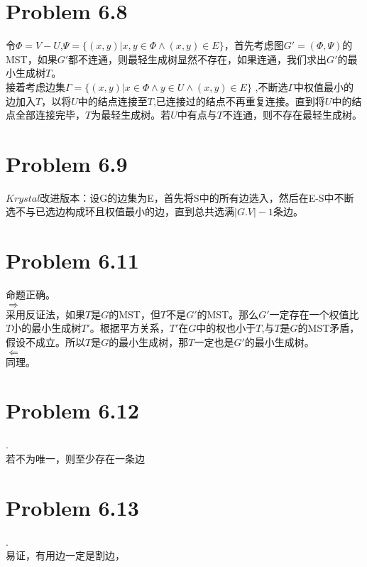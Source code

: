\documentclass[twocolumn]{ctexart}
\begin{document}
\section*{Problem 6.8}
\indent 令$\varPhi=V-U$,$\varPsi=\{(x,y)|x,y\in\varPhi \wedge (x,y)\in E\}$，首先考虑图$G'=(\varPhi,\varPsi)$的MST，如果$G'$都不连通，则最轻生成树显然不存在，如果连通，我们求出$G'$的最小生成树$T$。\\
\indent 接着考虑边集$\Gamma=\{(x,y)|x\in\varPhi \wedge y\in U \wedge (x,y)\in E \}$
,不断选$\Gamma$中权值最小的边加入$T$，以将$U$中的结点连接至$T$,已连接过的结点不再重复连接。直到将$U$中的结点全部连接完毕，$T$为最轻生成树。若$U$中有点与$T$不连通，则不存在最轻生成树。

\section*{Problem 6.9}
\indent $Krystal$改进版本：设G的边集为E，首先将S中的所有边选入，然后在E-S中不断选不与已选边构成环且权值最小的边，直到总共选满$|G.V|-1$条边。

\section*{Problem 6.11}
\noindent 命题正确。\\
\indent $\Rightarrow$\\
\indent 采用反证法，如果$T$是$G$的MST，但$T$不是$G'$的MST。那么$G'$一定存在一个权值比$T$小的最小生成树$T'$。根据平方关系，$T'$在$G$中的权也小于$T$,与$T$是$G$的MST矛盾，假设不成立。所以$T$是$G$的最小生成树，那$T$一定也是$G'$的最小生成树。\\

\indent $\Leftarrow$\\
\indent 同理。

\section*{Problem 6.12}
.\\
\indent 若不为唯一，则至少存在一条边


\section*{Problem 6.13}
.\\
\indent 易证，有用边一定是割边，
\end{document}
